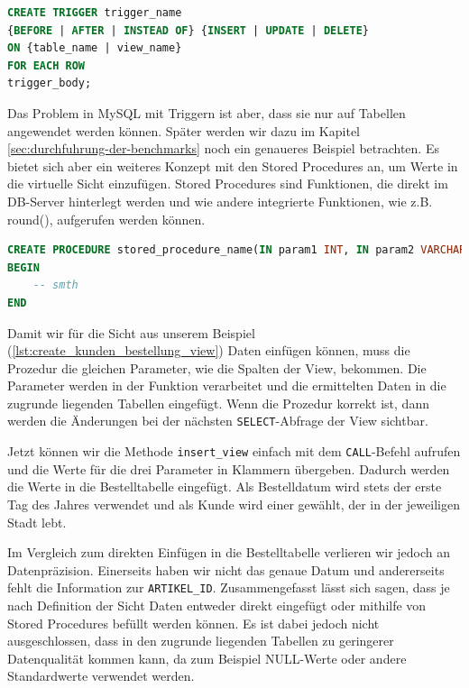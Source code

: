 \vspace{-5pt}
\begin{lstlisting}[language=SQL,caption=Allgemeine Trigger Deklaration,label={lst:allg-trigger-dekl}]
CREATE TRIGGER trigger_name
{BEFORE | AFTER | INSTEAD OF} {INSERT | UPDATE | DELETE}
ON {table_name | view_name}
FOR EACH ROW
trigger_body;
\end{lstlisting}
\vspace{-5pt}

Das Problem in MySQL mit Triggern ist aber, dass sie nur auf Tabellen angewendet werden können.
Später werden wir dazu im Kapitel \ref{sec:durchfuhrung-der-benchmarks} noch ein genaueres Beispiel betrachten.
Es bietet sich aber ein weiteres Konzept mit den Stored Procedures an, um Werte in die virtuelle Sicht einzufügen.
Stored Procedures sind Funktionen, die direkt im DB-Server hinterlegt werden und wie andere integrierte Funktionen, wie z.B. round(), aufgerufen werden können.

\begin{lstlisting}[language=SQL,caption=Allgemeine Prozedur Deklaration,label={lst:allg-stored-procedure-dekl}]
CREATE PROCEDURE stored_procedure_name(IN param1 INT, IN param2 VARCHAR(255))
BEGIN
    -- smth
END
\end{lstlisting}
\vspace{-5pt}

Damit wir für die Sicht aus unserem Beispiel (\ref{lst:create_kunden_bestellung_view}) Daten einfügen können, muss die Prozedur die gleichen Parameter, wie die Spalten der View, bekommen.
Die Parameter werden in der Funktion verarbeitet und die ermittelten Daten in die zugrunde liegenden Tabellen eingefügt.
Wenn die Prozedur korrekt ist, dann werden die Änderungen bei der nächsten \texttt{SELECT}-Abfrage der View sichtbar.



Jetzt können wir die Methode \texttt{insert\_view} einfach mit dem \texttt{CALL}-Befehl aufrufen und die Werte für die drei Parameter in Klammern übergeben.
Dadurch werden die Werte in die Bestelltabelle eingefügt.
Als Bestelldatum wird stets der erste Tag des Jahres verwendet und als Kunde wird einer gewählt, der in der jeweiligen Stadt lebt.

Im Vergleich zum direkten Einfügen in die Bestelltabelle verlieren wir jedoch an Datenpräzision.
Einerseits haben wir nicht das genaue Datum und andererseits fehlt die Information zur \texttt{ARTIKEL\_ID}.
Zusammengefasst lässt sich sagen, dass je nach Definition der Sicht Daten entweder direkt eingefügt oder mithilfe von Stored Procedures befüllt werden können.
Es ist dabei jedoch nicht ausgeschlossen, dass in den zugrunde liegenden Tabellen zu geringerer Datenqualität kommen kann, da zum Beispiel NULL-Werte oder andere Standardwerte verwendet werden.

